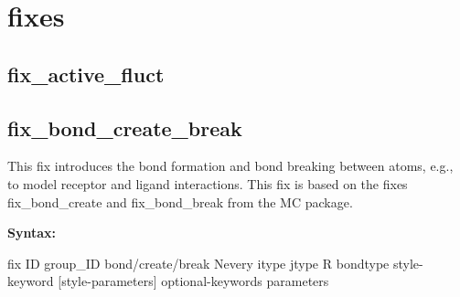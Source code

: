 
\section{fixes}

\subsection{fix\_active\_fluct}


\subsection{fix\_bond\_create\_break}

This fix introduces the bond formation and bond breaking between atoms, e.g., to model receptor and ligand interactions.
This fix is based on the fixes fix\_bond\_create and fix\_bond\_break from the MC package.

{\bfseries Syntax:}

fix ID group\_ID bond/create/break Nevery itype jtype R bondtype style-keyword [style-parameters] optional-keywords parameters

